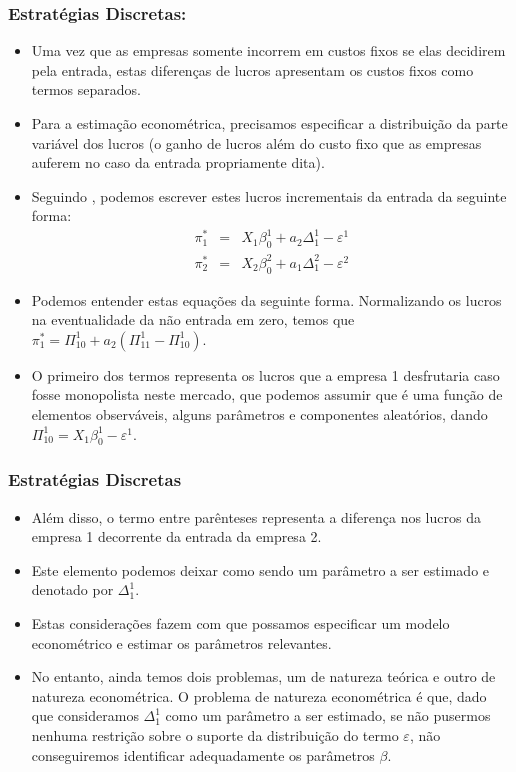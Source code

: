 \documentclass{beamer}
\begin{document}
\begin{frame}\frametitle{Estratégias Discretas:}
\scriptsize
\begin{itemize}
\item Uma vez que as empresas somente incorrem em custos fixos
se elas decidirem pela entrada, estas diferenças de lucros apresentam
os custos fixos como termos separados. 
\item Para a estimação econométrica, precisamos especificar
a distribuição da parte variável dos lucros (o ganho de lucros além
do custo fixo que as empresas auferem no caso da entrada propriamente
dita).
\item Seguindo \citet{Bresnahan1991}, podemos escrever
estes lucros incrementais da entrada da seguinte forma:
\begin{eqnarray*}
\pi_{1}^{*} & = & X_{1}\beta_{0}^{1}+a_{2}\Delta_{1}^{1}-\varepsilon^{1}\\
\pi_{2}^{*} & = & X_{2}\beta_{0}^{2}+a_{1}\Delta_{1}^{2}-\varepsilon^{2}
\end{eqnarray*}

\item Podemos entender estas equações da seguinte forma. Normalizando
os lucros na eventualidade da não entrada em zero, temos que $\pi_{1}^{*}=\Pi_{10}^{1}+a_{2}(\Pi_{11}^{1}-\Pi_{10}^{1})$. 
\item O primeiro dos termos representa os lucros que a empresa
1 desfrutaria caso fosse monopolista neste mercado, que podemos assumir
que é uma função de elementos observáveis, alguns parâmetros e componentes
aleatórios, dando $\Pi_{10}^{1}=X_{1}\beta_{0}^{1}-\varepsilon^{1}$.
\end{itemize}
\end{frame}

\begin{frame}\frametitle{Estratégias Discretas }

\begin{itemize}
\item Além disso, o termo entre parênteses representa a diferença nos lucros
da empresa 1 decorrente da entrada da empresa 2. 
\item Este elemento podemos deixar como sendo um parâmetro a ser estimado
e denotado por $\Delta_{1}^{1}$. 
\item Estas considerações fazem com que possamos especificar um modelo econométrico
e estimar os parâmetros relevantes. 
\item No entanto, ainda temos dois problemas, um de natureza teórica e outro
de natureza econométrica. O problema de natureza econométrica é que,
dado que consideramos $\Delta_{1}^{1}$ como um parâmetro a ser estimado,
se não pusermos nenhuma restrição sobre o suporte da distribuição
do termo $\varepsilon$, não conseguiremos identificar adequadamente
os parâmetros $\beta$. 
\end{itemize}
\end{frame}
\end{document}
